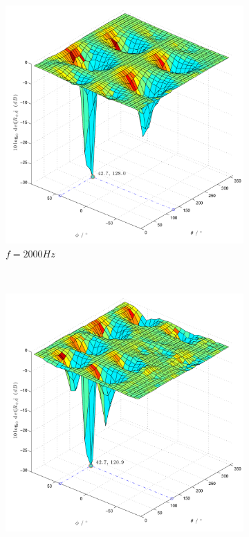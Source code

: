 \begin{figure}
\begin{subfigure}[b]{0.48\textwidth}
                \includegraphics[width=\textwidth]{images/02_Konzeptionierung/Sim_sine_f_2000_Phi_45_Theta_120_dB_SNR_100dB}
                \caption{$f=2000Hz$}
                \label{fig:Sim_sine_f_2000_Phi_45_Theta_120_dB_SNR_100dB}
        \end{subfigure}
        ~ %
        \begin{subfigure}[b]{0.48\textwidth}
                \centering
                \includegraphics[width=\textwidth]{images/02_Konzeptionierung/Sim_sine_f_3000_Phi_45_Theta_120_dB_SNR_100dB}

\end{subfigure}
\end{figure}

